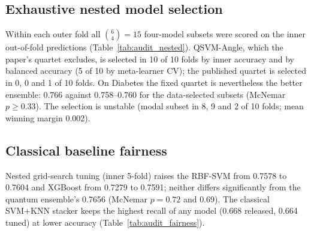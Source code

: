\documentclass[11pt,a4paper]{article}
\newcommand{\tabdir}{../reimplementation/tex/}
\begin{document}
\subsection{Exhaustive nested model selection}
Within each outer fold all $\binom{6}{4}=15$ four-model subsets were scored on the inner out-of-fold predictions (Table~\ref{tab:audit_nested}). QSVM-Angle, which the paper's quartet excludes, is selected in 10 of 10 folds by inner accuracy and by balanced accuracy (5 of 10 by meta-learner CV); the published quartet is selected in 0, 0 and 1 of 10 folds. On Diabetes the fixed quartet is nevertheless the better ensemble: 0.766 against 0.758--0.760 for the data-selected subsets (McNemar $p\ge0.33$). The selection is unstable (modal subset in 8, 9 and 2 of 10 folds; mean winning margin 0.002).


\subsection{Classical baseline fairness}
Nested grid-search tuning (inner 5-fold) raises the RBF-SVM from 0.7578 to 0.7604 and XGBoost from 0.7279 to 0.7591; neither differs significantly from the quantum ensemble's 0.7656 (McNemar $p=0.72$ and $0.69$). The classical SVM+KNN stacker keeps the highest recall of any model (0.668 released, 0.664 tuned) at lower accuracy (Table~\ref{tab:audit_fairness}).


\end{document}
